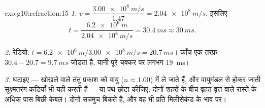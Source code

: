 \begin{solution}{exo:g10:refraction:15}
\emph{1.} $v = \dfrac{\qty{3.00e8}{m/s}}{1.47} = \qty{2.04e8}{m/s}$, इसलिए
\[
t = \frac{\qty{6.2e6}{m}}{\qty{2.04e8}{m/s}} = \qty{30.4}{ms} \approx
\qty{30}{ms}.
\]

\emph{2.} रेडियो: $t = \qty{6.2e6}{m}/\qty{3.00e8}{m/s} =
\qty{20.7}{ms}$। काँच एक तरफ़ $30.4 - 20.7 = \qty{9.7}{ms}$ जोड़ता है, यानी पूरे
चक्कर पर लगभग \qty{19}{ms}।

\emph{3.}  घटाइए --- खोखले  वाले तंतु प्रकाश को
वायु ($n \approx 1.00$) में ले जाते हैं, और वायुमंडल से होकर जाती सूक्ष्मतरंग
कड़ियाँ भी यही करती हैं --- या पथ छोटा कीजिए: दोनों शहरों के बीच वृहत
वृत्त वाले रास्ते के अधिक पास बिछी केबल। दोनों सचमुच बिकते हैं, और वह
भी प्रति मिलीसेकंड के भाव पर।
\end{solution}

